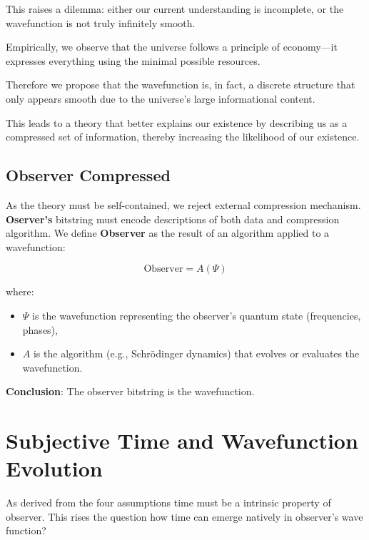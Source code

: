\documentclass[11pt]{article}
\begin{document}
This raises a dilemma: either our current understanding is incomplete, or the wavefunction is not truly infinitely smooth.

Empirically, we observe that the universe follows a principle of economy—it expresses everything using the minimal possible resources.

Therefore we propose that the wavefunction is, in fact, a discrete structure that only appears smooth due to the universe’s large informational content.

This leads to a theory that better explains our existence by describing us as a compressed set of information, thereby increasing the likelihood of our existence.


\subsection{Observer Compressed}

As the theory must be self-contained, we reject external compression mechanism. \textbf{Oserver's} bitstring must encode descriptions of both data and compression algorithm. We define \textbf{Observer} as the result of an algorithm applied to a wavefunction:

\begin{equation}
      \text{Observer} = A(\Psi)
\end{equation}

where:
\begin{itemize}
      \item \( \Psi \) is the wavefunction representing the observer's quantum state (frequencies, phases),
      \item \( A \) is the algorithm (e.g., Schrödinger dynamics) that evolves or evaluates the wavefunction.
\end{itemize}

\vspace{1em}


\textbf{Conclusion}: The observer bitstring is the wavefunction.



\section{Subjective Time and Wavefunction Evolution}

As derived from the four assumptions \cite{meskanen2019} time must be a intrinsic property of observer. This rises the question how time can emerge natively in observer's wave function?
\end{document}
